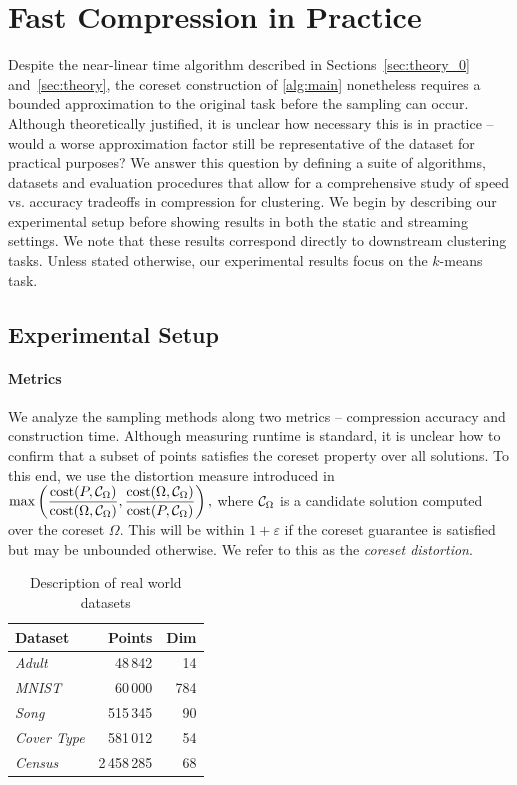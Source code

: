\section{Fast Compression in Practice}
\label{sec:results}

Despite the near-linear time algorithm described in Sections~\ref{sec:theory_0} and~\ref{sec:theory}, the coreset construction of \cref{alg:main} nonetheless
requires a bounded approximation to the original task before the sampling can occur. Although theoretically justified, it is unclear how necessary this is in
practice -- would a worse approximation factor still be representative of the dataset for practical purposes? We answer this question by defining a suite of
algorithms, datasets and evaluation procedures that allow for a comprehensive study of speed vs. accuracy tradeoffs in compression for clustering.  We begin by
describing our experimental setup before showing results in both the static and streaming settings. We note that these results correspond directly to
downstream clustering tasks. Unless stated otherwise, our experimental results focus on the $k$-means task.

\subsection{Experimental Setup}
\paragraph*{Metrics}
\label{sssec:metrics}

We analyze the sampling methods along two metrics -- compression accuracy and construction time. Although measuring runtime is standard, it is unclear how to
confirm that a subset of points satisfies the coreset property over all solutions. To this end, we use the distortion measure introduced in~\cite{chrisESA} $
\max \left( \dfrac{\operatorname{cost}(P, \mathcal C_{\Omega})}{\operatorname{cost}(\Omega, \mathcal C_{\Omega})}, \dfrac{\operatorname{cost}(\Omega, \mathcal C_{\Omega})}{\operatorname{cost}(P, \mathcal C_{\Omega})} \right),$ where
$\mathcal C_{\Omega}$ is a candidate solution computed over the coreset $\Omega$. This will be within $1+\varepsilon$ if the coreset guarantee is satisfied
but may be unbounded otherwise.  We refer to this as the \emph{coreset distortion}.

\begin{table}
    \centering
    \begin{tabular}{lrr}
        Dataset & Points & Dim \\
        \hline
        \emph{Adult} & 48\,842 & 14 \\
        \emph{MNIST} & 60\,000 & 784 \\
        \emph{Song} & 515\,345 & 90 \\
        \emph{Cover Type} & 581\,012 & 54 \\
        \emph{Census} & 2\,458\,285 & 68 \\
        \hline
    \end{tabular}
    \caption{Description of real world datasets}
    \label{tbl:datasets}
\end{table}


